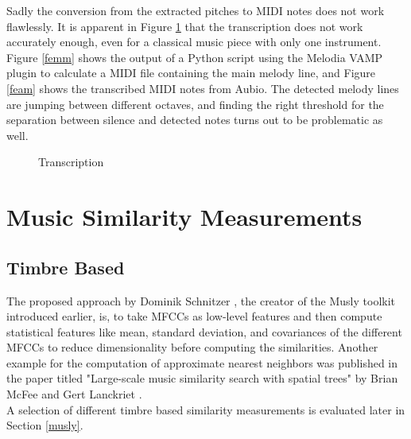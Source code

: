 \noindent Sadly the conversion from the extracted pitches to MIDI notes does not work flawlessly. It is apparent in Figure \ref{fig:transc} that the transcription does not work accurately enough, even for a classical music piece with only one instrument. Figure \ref{femm} shows the output of a Python script using the Melodia VAMP plugin to calculate a MIDI file containing the main melody line, and Figure \ref{feam} shows the transcribed MIDI notes from Aubio. The detected melody lines are jumping between different octaves, and finding the right threshold for the separation between silence and detected notes turns out to be problematic as well.

\begin{figure}[htbp]
	\centering
	\caption{Transcription}
	\label{fig:transc}
\end{figure}
\FloatBarrier 

\section{Music Similarity Measurements}

\subsection{Timbre Based}

The proposed approach by Dominik Schnitzer \cite{schnitzer1}, the creator of the Musly toolkit introduced earlier, is, to take MFCCs as low-level features and then compute statistical features like mean, standard deviation, and covariances of the different MFCCs to reduce dimensionality before computing the similarities. Another example for the computation of approximate nearest neighbors was published in the paper titled "Large-scale music similarity search with spatial trees" by Brian McFee and Gert Lanckriet \cite{msd4}.\\ 
A selection of different timbre based similarity measurements is evaluated later in Section \ref{musly}.

